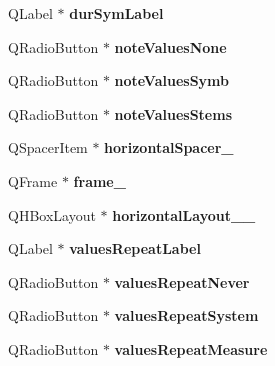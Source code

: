 \begin{DoxyCompactItemize}
Q\+Label $\ast$ {\bfseries dur\+Sym\+Label}
\item 
\mbox{\label{class_ui___edit_staff_type_ac3b7acb11cd5d21033d77d2cd3ea9c28}} 
Q\+Radio\+Button $\ast$ {\bfseries note\+Values\+None}
\item 
\mbox{\label{class_ui___edit_staff_type_aed9dd3b2c68d6395e486ba5468dc16fc}} 
Q\+Radio\+Button $\ast$ {\bfseries note\+Values\+Symb}
\item 
\mbox{\label{class_ui___edit_staff_type_a9c05282ea085178c5197982156cb191a}} 
Q\+Radio\+Button $\ast$ {\bfseries note\+Values\+Stems}
\item 
\mbox{\label{class_ui___edit_staff_type_a7ad96249d820a874da1bce57edab98ca}} 
Q\+Spacer\+Item $\ast$ {\bfseries horizontal\+Spacer\+\_}
\item 
\mbox{\label{class_ui___edit_staff_type_aab8f20f6a7ebe2e007beaba711b9b160}} 
Q\+Frame $\ast$ {\bfseries frame\+\_}
\item 
\mbox{\label{class_ui___edit_staff_type_aa6c30176f467de316a60c72bc076dca7}} 
Q\+H\+Box\+Layout $\ast$ {\bfseries horizontal\+Layout\+\_\+\_}
\item 
\mbox{\label{class_ui___edit_staff_type_afbe0d771fe8c6b9bf4e79671259cdbd7}} 
Q\+Label $\ast$ {\bfseries values\+Repeat\+Label}
\item 
\mbox{\label{class_ui___edit_staff_type_addee84dd8485b37a6b38ed31566a9bce}} 
Q\+Radio\+Button $\ast$ {\bfseries values\+Repeat\+Never}
\item 
\mbox{\label{class_ui___edit_staff_type_aed934f938afbb19b97db7dbe16dc462c}} 
Q\+Radio\+Button $\ast$ {\bfseries values\+Repeat\+System}
\item 
\mbox{\label{class_ui___edit_staff_type_ab6fa82711b6b813ac11eba7172970112}} 
Q\+Radio\+Button $\ast$ {\bfseries values\+Repeat\+Measure}
\item 

\end{DoxyCompactItemize}
